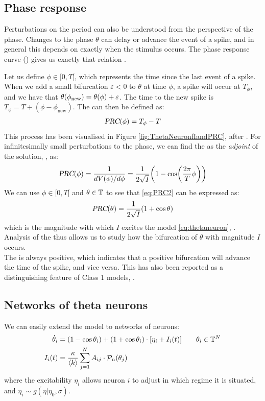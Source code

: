 \subsection{Phase response} \label{sec:TheThetaNeuronModelPhaseResponse}
Perturbations on the period can also be understood from the perspective of the phase. Changes to the phase $\theta$ can delay or advance the event of a spike, and in general this depends on exactly when the stimulus occurs. The phase response curve (\PRC) gives us exactly that relation \cite{Perez2020, Gutkin2014}.

Let us define $\phi \in [0, T[$, which represents the time since the last event of a spike. When we add a small bifurcation $\varepsilon < 0 $ to $\theta$ at time $\phi$, a spike will occur at $T_{\phi}$, and we have that $\theta(\phi_{\rm new}) = \theta(\phi) + \varepsilon$. The time to the new spike is $T_{\phi} = T + (\phi - \phi_{\text{new}})$. The \PRC can then be defined as:
\begin{align}
{\textsl{PRC}}(\phi) =T_{\phi} - T \label{eq:PRC1}
\end{align}
This process has been visualised in Figure \ref{fig:ThetaNeuronfIandPRC}, after \cite{Perez2020}. For infinitesimally small perturbations to the phase, we can find the \PRC as the \textsl{adjoint} of the solution, \cite{Gutkin2014}, as:
\begin{align}
\PRC(\phi) = \frac{1}{d V(\phi) / d \phi} = \frac{1}{2 \sqrt{I}} \left(1-\cos \left( \frac{2 \pi}{T} \phi \right) \right) \label{eq:PRC2}
\end{align}
We can use $\phi \in [0, T[$ and $\theta \in {\mathbb{T}}$ to see that \eqref{eq:PRC2} can be expressed as:
\begin{align}
\PRC(\theta) = \frac{1}{2 \sqrt{I}} \left( 1 + \cos \theta \right) \label{eq:PRC3}
\end{align}
which is the magnitude with which $I$ excites the model \eqref{eq:thetaneuron}, \cite{Ermentrout1996}. Analysis of the \PRC thus allows us to study how the bifurcation of $\theta$ with magnitude $I$ occurs.\\


The \PRC is always positive, which indicates that a positive bifurcation will advance the time of the spike, and vice versa. This has also been reported as a distinguishing feature of Class 1 models, \cite{Ermentrout1996}.


\subsection{Networks of theta neurons}
We can easily extend the model to networks of neurons:
\begin{align}
\dot{\theta}_{i} &=\left(1-\cos \theta_{i}\right)+\left(1+\cos \theta_{i}\right) \cdot \left[\eta_{i} + I_{i}(t)\right] \qquad \theta_i \in \T^N  \label{eq:thetaneuronnetwork} \\
I_{i}(t) &=\frac{\kappa}{\kmean} \sum_{j=1}^{N} A_{i j} \cdot \mathcal{P}_{n}(\theta_{j}) \label{eq:thetaneuronnetworkcurrent}
\end{align}
where the excitability $\eta_i$ allows neuron $i$ to adjust in which regime it is situated, and $\eta_i \sim g(\eta \rvert \eta_0, \sigma)$.

